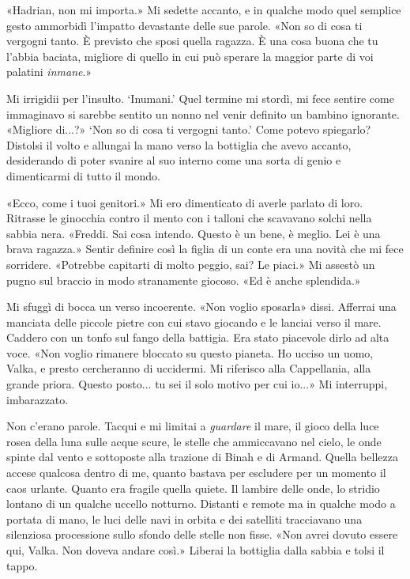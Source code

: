«Hadrian, non mi importa.» Mi sedette accanto, e in qualche modo quel
semplice gesto ammorbidì l'impatto devastante delle sue parole. «Non so
di cosa ti vergogni tanto. È previsto che sposi quella ragazza. È una
cosa buona che tu l'abbia baciata, migliore di quello in cui può sperare
la maggior parte di voi palatini \emph{inmane}.»

Mi irrigidii per l'insulto. `Inumani.' Quel termine mi stordì, mi fece
sentire come immaginavo si sarebbe sentito un nonno nel venir definito
un bambino ignorante. «Migliore di...?» `Non so di cosa ti vergogni
tanto.' Come potevo spiegarlo? Distolsi il volto e allungai la mano
verso la bottiglia che avevo accanto, desiderando di poter svanire al
suo interno come una sorta di genio e dimenticarmi di tutto il mondo.

«Ecco, come i tuoi genitori.» Mi ero dimenticato di averle parlato di
loro. Ritrasse le ginocchia contro il mento con i talloni che scavavano
solchi nella sabbia nera. «Freddi. Sai cosa intendo. Questo è un bene, è
meglio. Lei è una brava ragazza.» Sentir definire così la figlia di un
conte era una novità che mi fece sorridere. «Potrebbe capitarti di molto
peggio, sai? Le piaci.» Mi assestò un pugno sul braccio in modo
stranamente giocoso. «Ed è anche splendida.»

Mi sfuggì di bocca un verso incoerente. «Non voglio sposarla» dissi.
Afferrai una manciata delle piccole pietre con cui stavo giocando e le
lanciai verso il mare. Caddero con un tonfo sul fango della battigia.
Era stato piacevole dirlo ad alta voce. «Non voglio rimanere bloccato su
questo pianeta. Ho ucciso un uomo, Valka, e presto cercheranno di
uccidermi. Mi riferisco alla Cappellania, alla grande priora. Questo
posto... tu sei il solo motivo per cui io...» Mi interruppi,
imbarazzato.

Non c'erano parole. Tacqui e mi limitai a \emph{guardare} il mare, il
gioco della luce rosea della luna sulle acque scure, le stelle che
ammiccavano nel cielo, le onde spinte dal vento e sottoposte alla
trazione di Binah e di Armand. Quella bellezza accese qualcosa dentro di
me, quanto bastava per escludere per un momento il caos urlante. Quanto
era fragile quella quiete. Il lambire delle onde, lo stridio lontano di
un qualche uccello notturno. Distanti e remote ma in qualche modo a
portata di mano, le luci delle navi in orbita e dei satelliti
tracciavano una silenziosa processione sullo sfondo delle stelle non
fisse. «Non avrei dovuto essere qui, Valka. Non doveva andare così.»
Liberai la bottiglia dalla sabbia e tolsi il tappo.

